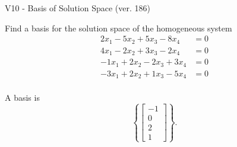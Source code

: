 \begin{exercise}
  \begin{exerciseTitle}V10 - Basis of Solution Space (ver. 186)\end{exerciseTitle}
  \begin{exerciseStatement}
    Find a basis for the solution space of the homogeneous system 
\begin{align*}
 2 x_ 1 -5 x_ 2 + 5 x_ 3 -8 x_ 4 &= 0  \\ 
  4 x_ 1 -2 x_ 2 + 3 x_ 3 -2 x_ 4 &= 0  \\ 
  -1 x_ 1 + 2 x_ 2 -2 x_ 3 + 3 x_ 4 &= 0  \\ 
  -3 x_ 1 + 2 x_ 2 + 1 x_ 3 -5 x_ 4 &= 0  \\ 
 \end{align*}


 
  \end{exerciseStatement}

  \begin{exerciseAnswer}
   A basis is   
\[\left\{\left[\begin{array}{c}
-1 \\
0 \\
2 \\
1
\end{array}\right]\right\}.\]

  


  \end{exerciseAnswer}
\end{exercise}